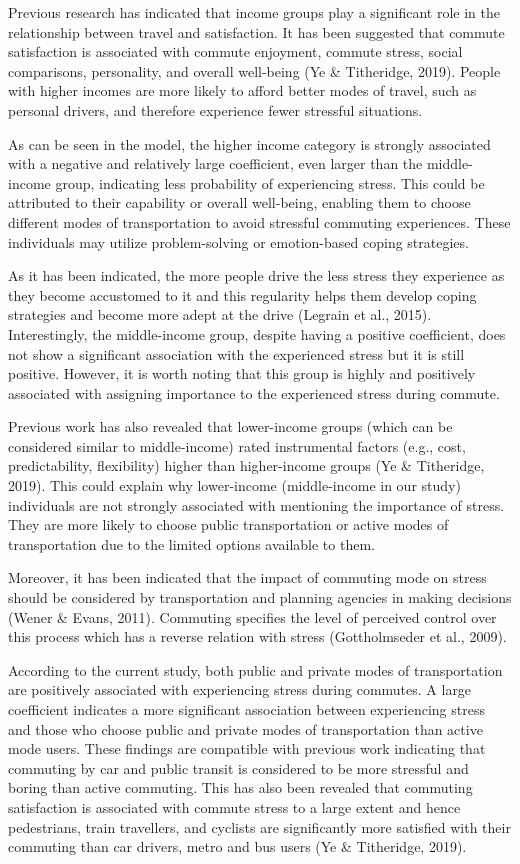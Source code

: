\documentclass[
11pt, %
oneside, %
english, %
singlespacing, %
]{macthesis} %
\begin{document}
Previous research has indicated that income groups play a significant role in the relationship between travel and satisfaction. It has been suggested that commute satisfaction is associated with commute enjoyment, commute stress, social comparisons, personality, and overall well-being (Ye \& Titheridge, 2019). People with higher incomes are more likely to afford better modes of travel, such as personal drivers, and therefore experience fewer stressful situations.

As can be seen in the model, the higher income category is strongly associated with a negative and relatively large coefficient, even larger than the middle-income group, indicating less probability of experiencing stress. This could be attributed to their capability or overall well-being, enabling them to choose different modes of transportation to avoid stressful commuting experiences. These individuals may utilize problem-solving or emotion-based coping strategies.

As it has been indicated, the more people drive the less stress they experience as they become accustomed to it and this regularity helps them develop coping strategies and become more adept at the drive (Legrain et al., 2015). Interestingly, the middle-income group, despite having a positive coefficient, does not show a significant association with the experienced stress but it is still positive. However, it is worth noting that this group is highly and positively associated with assigning importance to the experienced stress during commute.

Previous work has also revealed that lower-income groups (which can be considered similar to middle-income) rated instrumental factors (e.g., cost, predictability, flexibility) higher than higher-income groups (Ye \& Titheridge, 2019). This could explain why lower-income (middle-income in our study) individuals are not strongly associated with mentioning the importance of stress. They are more likely to choose public transportation or active modes of transportation due to the limited options available to them.

Moreover, it has been indicated that the impact of commuting mode on stress should be considered by transportation and planning agencies in making decisions (Wener \& Evans, 2011). Commuting specifies the level of perceived control over this process which has a reverse relation with stress (Gottholmseder et al., 2009).

According to the current study, both public and private modes of transportation are positively associated with experiencing stress during commutes. A large coefficient indicates a more significant association between experiencing stress and those who choose public and private modes of transportation than active mode users. These findings are compatible with previous work indicating that commuting by car and public transit is considered to be more stressful and boring than active commuting. This has also been revealed that commuting satisfaction is associated with commute stress to a large extent and hence pedestrians, train travellers, and cyclists are significantly more satisfied with their commuting than car drivers, metro and bus users (Ye \& Titheridge, 2019).
\end{document}
